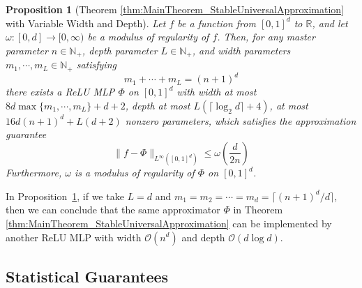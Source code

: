 \documentclass{article}
\numberwithin{equation}{section}
\newtheorem{proposition}{Proposition}[section]
\theoremstyle{definition}
\newtheorem{example}{Example}[section]
\begin{document}
\begin{proposition}[Theorem \ref{thm:MainTheorem_StableUniversalApproximation} with Variable Width and Depth]
\label{prop:MainTheorem_AdjustableSize}
    Let $f$ be a function from $[0,1]^d$ to $\mathbb{R}$, and let $\omega:[0,d]\rightarrow [0,\infty)$ be a modulus of regularity of $f$. Then, for any master parameter $n\in \mathbb{N}_+$, depth parameter $L\in\mathbb{N}_+$, and width parameters $m_1,\cdots,m_L\in\mathbb{N}_+$ satisfying
    \[
        m_1 + \cdots + m_L = (n+1)^d
    \]
    there exists a ReLU MLP $\Phi$ on $[0,1]^d$ with width at most $8d \max\{m_1,\cdots,m_L\} + d + 2$, depth at most $L (\lceil \log_2{d} \rceil + 4)$, at most $16d(n+1)^d + L(d+2)$ nonzero parameters, which satisfies the approximation guarantee 
    \[
        \| f-\Phi \|_{L^{\infty}([0,1]^d)} 
        \le 
        \omega\left(\frac{d}{2n}\right)
    \]
    Furthermore, $\omega$ is a modulus of regularity of $\Phi$ on $[0,1]^d$.
\end{proposition}

In Proposition~\ref{prop:MainTheorem_AdjustableSize}, if we take $L=d$ and $m_1 = m_2 = \cdots = m_d = \lceil (n+1)^d/d \rceil$, then we can conclude that the same approximator $\Phi$ in Theorem \ref{thm:MainTheorem_StableUniversalApproximation} can be implemented by another ReLU MLP with width $\mathcal{O}(n^d)$ and depth $\mathcal{O}(d \log{d})$. 




\subsection{Statistical Guarantees}
\label{s:Main__ss:Stats}
\end{document}
